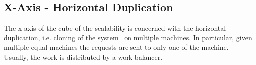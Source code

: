 \subsection{X-Axis - Horizontal Duplication}

The x-axis of the cube of the scalability is concerned with the horizontal
duplication, i.e. cloning of the system~\cite{bib:art-of-scalability} on 
multiple machines.
In particular, given multiple equal machines the requests are sent to only one
of the machine. Usually, the work is distributed by a work balancer.

